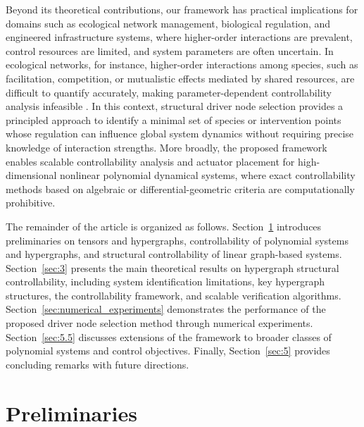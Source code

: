 \documentclass[journal,twoside,web]{ieeecolor}
\begin{document}
Beyond its theoretical contributions, our framework has practical implications for domains such as ecological network management, biological regulation, and engineered infrastructure systems, where higher-order interactions are prevalent, control resources are limited, and system parameters are often uncertain.
%
In ecological networks, for instance, higher-order interactions among species, such as facilitation, competition, or mutualistic effects mediated by shared resources, are difficult to quantify accurately, making parameter-dependent controllability analysis infeasible \cite{bairey2016high,mayfield2017higher}.
%
In this context, structural driver node selection provides a principled approach to identify a minimal set of species or intervention points whose regulation can influence global system dynamics without requiring precise knowledge of interaction strengths.
%
More broadly, the proposed framework enables scalable controllability analysis and actuator placement for high-dimensional nonlinear polynomial dynamical systems, where exact controllability methods based on algebraic or differential-geometric criteria are computationally prohibitive.



The remainder of the article is organized as follows.
%
Section~\ref{sec:2} introduces preliminaries on tensors and hypergraphs, controllability of polynomial systems and hypergraphs, and structural controllability of linear graph-based systems.
%
Section~\ref{sec:3} presents the main theoretical results on hypergraph structural controllability, including system identification limitations, key hypergraph structures, the controllability framework, and scalable verification algorithms.
%
Section~\ref{sec:numerical_experiments} demonstrates the performance of the proposed driver node selection method through numerical experiments.
%
Section~\ref{sec:5.5} discusses extensions of the framework to broader classes of polynomial systems and control objectives.
%
Finally, Section~\ref{sec:5} provides concluding remarks with future directions.


\section{Preliminaries}\label{sec:2}
\end{document}
